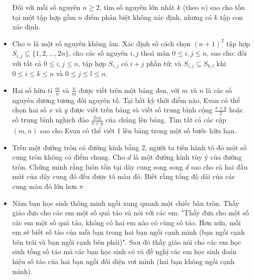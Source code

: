 \documentclass[11pt]{scrartcl}
\begin{document}
\begin{itemize}[label=, leftmargin=0em, itemsep=-0em]
\begin{btvn}
        Đối với mỗi số nguyên $n\ge 2$, tìm số nguyên lớn nhất $k$ (theo $n$) sao cho tồn tại một tập hợp gồm $n$ điểm phân biệt không xác định, nhưng có $k$ tập con xác định.
    \end{btvn}
    \item \begin{btvn}
        Cho $n$ là một số nguyên không âm. Xác định số cách chọn $(n+1)^2$ tập hợp $S_{i,j}\subseteq\{1,2,\ldots,2n\}$, cho các số nguyên $i,j$ thoả mãn $0\leq i,j\leq n$, sao cho:
        đối với tất cả $0\leq i,j\leq n$, tập hợp $S_{i,j}$ có $i+j$ phần tử; và
        $S_{i,j}\subseteq S_{k,l}$ khi $0\leq i\leq k\leq n$ và $0\leq j\leq l\leq n$.
    \end{btvn}
    \item \begin{btvn}
        Hai số hữu tỉ \(\tfrac{m}{n}\) và \(\tfrac{n}{m}\) được viết trên một bảng đen, với \(m\) và \(n\) là các số nguyên dương tương đối nguyên tố. Tại bất kỳ thời điểm nào, Evan có thể chọn hai số \(x\) và \(y\) được viết trên bảng và viết số trung bình cộng \(\tfrac{x+y}{2}\) hoặc số trung bình nghịch đảo \(\tfrac{2xy}{x+y}\) của chúng lên bảng. Tìm tất cả các cặp \((m,n)\) sao cho Evan có thể viết 1 lên bảng trong một số bước hữu hạn.
    \end{btvn}
    \item \begin{btvn}
        Trên một đường tròn có đường kính bằng 2, người ta tiến hành tô đỏ một số cung tròn không có điểm chung. Cho $d$ là một đường kính tùy ý của đường tròn. Chứng minh rằng luôn tồn tại dây cung song song $d$ sao cho cả hai đầu mút của dây cung đó đều được tô màu đỏ. Biết rằng tổng độ dài của các cung màu đỏ lớn hơn $\pi$
    \end{btvn}
    \item \begin{btvn}
        Năm bạn học sinh thông minh ngồi xung quanh một chiếc bàn tròn. Thầy giáo đưa cho các em một số quả táo và nói với các em: "Thầy đưa cho một số các em một số quả táo, không có hai em nào có cùng số táo. Hơn nữa, mỗi em sẽ biết số táo của mỗi bạn trong hai bạn ngồi cạnh mình (bạn ngồi cạnh bên trái và bạn ngồi cạnh bên phải)". Sau đó thầy giáo nói cho các em học sinh tồng số táo mà các bạn học sinh có và đề nghị các em học sinh đoán hiệu số táo của hai bạn ngồi đối diện vơi mình (hai bạn không ngồi cạnh mình).

\end{btvn}
\end{itemize}
\end{document}
